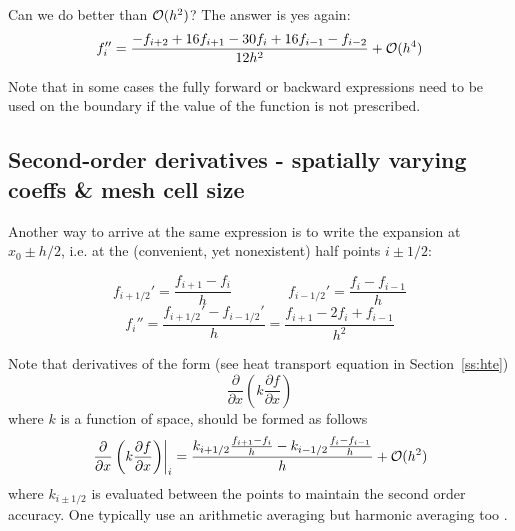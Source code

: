 \noindent Can we do better than ${\cal O}(h^2)$? The answer is yes again:
\begin{equation}
f_i'' = \frac{-f_{i+2} + 16 f_{i+1} -30 f_i + 16 f_{i-1} - f_{i-2} }{12 h^2} + {\cal O}(h^4)
\label{eq:fpp2}
\end{equation}

Note that in some cases the fully forward or backward expressions 
need to be used on the boundary if the value of the function is not prescribed.

\subsection{Second-order derivatives - spatially varying coeffs \& mesh cell size}

Another way to arrive at the same expression is to write the expansion at $x_0 \pm h/2$, 
i.e. at the (convenient, yet nonexistent) half points $i\pm 1/2$:

\begin{center}

\end{center}


%     
%

\begin{equation}
f_{i+1/2}'=\frac{f_{i+1}-f_i}{h}
\quad\quad
\quad\quad
f_{i-1/2}'=\frac{f_{i}-f_{i-1}}{h}
\end{equation}
\begin{equation}
f_i''=\frac{f_{i+1/2}'-f_{i-1/2}'}{h} = 
\frac{f_{i+1}-2f_i+f_{i-1}}{h^2} 
\end{equation}

Note that derivatives of the form (see heat transport equation in Section~\ref{ss:hte}) 
\begin{equation}
\frac{\partial }{\partial x} \left(  k  \frac{\partial f}{\partial x} \right)
\end{equation}
where $k$ is a function of space, should be formed as follows
\begin{equation}
\left. \frac{\partial }{\partial x} \left(  k  \frac{\partial f}{\partial x} \right) \right|_i
=
\frac{ k_{i+1/2} \frac{f_{i+1}-f_i}{h} - k_{i-1/2}\frac{f_i-f_{i-1}}{h}    }{h} + {\cal O}(h^2)
\label{eq:fdm_discterms}
\end{equation}
where $k_{i\pm 1/2}$ is evaluated between the points to maintain the second order accuracy.
One typically use an arithmetic averaging but harmonic averaging too \cite{gery19book}.

